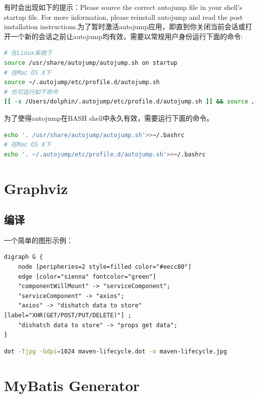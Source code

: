 \documentclass[letter]{book}
\begin{document}
有时会出现如下的提示：Please source the correct autojump file in your shell's startup file. For more information, please reinstall autojump and read the post installation instructions.为了暂时激活autojump应用，即直到你关闭当前会话或打开一个新的会话之前让autojump均有效，需要以常规用户身份运行下面的命令:

\begin{lstlisting}[language=Bash]
# 在Linux系统下
source /usr/share/autojump/autojump.sh on startup
# 在Mac OS X下
source ~/.autojump/etc/profile.d/autojump.sh
# 也可运行如下命令
[[ -s /Users/dolphin/.autojump/etc/profile.d/autojump.sh ]] && source /Users/dolphin/.autojump/etc/profile.d/autojump.sh
\end{lstlisting}

为了使得autojump在BASH shell中永久有效，需要运行下面的命令。

\begin{lstlisting}[language=Bash]
echo '. /usr/share/autojump/autojump.sh'>>~/.bashrc
# 在Mac OS X下
echo '. ~/.autojump/etc/profile.d/autojump.sh'>>~/.bashrc
\end{lstlisting}

\section{Graphviz}

\subsection{编译}

一个简单的图形示例：

\begin{lstlisting}
digraph G {
	node [peripheries=2 style=filled color="#eecc80"]
	edge [color="sienna" fontcolor="green"]
	"componentWillMount" -> "serviceComponent";
	"serviceComponent" -> "axios";
	"axios" -> "dishatch data to store"[label="XHR(GET/POST/PUT/DELETE)"] ;
	"dishatch data to store" -> "props get data";
}
\end{lstlisting}

\begin{lstlisting}[language=Bash]
dot -Tjpg -Gdpi=1024 maven-lifecycle.dot -o maven-lifecycle.jpg
\end{lstlisting}

\section{MyBatis Generator}
\end{document}
